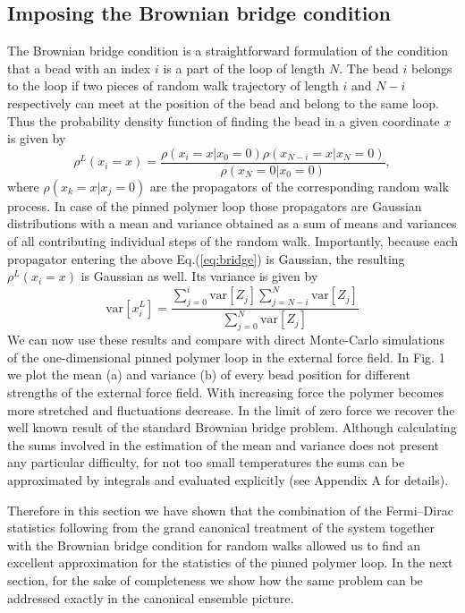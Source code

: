 \documentclass[aps,showpacs,twocolumn,floatfix,prx,superscriptaddress]{revtex4-1}
\begin{document}
\subsection{Imposing the Brownian bridge condition}
The Brownian bridge condition is a straightforward formulation of the condition
that a bead with an index $i$ is a part of the loop of length $N$. The bead $i$
belongs to the loop if two pieces of random walk trajectory of length $i$ and
$N-i$ respectively can meet at the position of the bead and belong to the same
loop. Thus the probability density function of finding the bead in a given
coordinate $x$ is given by
\begin{equation}
    \label{eq:bridge}
    \rho^L\left(x_i = x\right) = \frac{\rho\left(x_i = x \vert x_0 = 0\right)
        \rho\left(x_{N-i} = x \vert x_N = 0\right)}{\rho\left(x_N = 0 \vert x_0
            = 0\right)},
\end{equation}
where $ \rho\left(x_k = x \vert x_j = 0\right)$ are the propagators of the
corresponding random walk process. In case of the pinned polymer loop those
propagators are Gaussian distributions with a mean and variance obtained as a
sum of means and variances of all contributing individual steps of the random
walk. Importantly, because each propagator entering the above
Eq.(\ref{eq:bridge}) is Gaussian, the resulting $\rho^L\left(x_i = x\right)$ is
Gaussian as well. Its variance is given by
\begin{equation}
    \text{var}\left[x_i^L\right] =
    \frac{\sum_{j=0}^i\text{var}\left[Z_j\right]\sum_{j=N-i}^N\text{var}\left[Z_j\right]}{\sum_{j=0}^N\text{var}\left[Z_j\right]}
\end{equation}
We can now use these results and compare with direct Monte-Carlo simulations of
the one-dimensional pinned polymer loop in the external force field. In Fig. 1
we plot the mean (a) and variance (b) of every bead position for different
strengths of the external force field. With increasing force the polymer becomes
more stretched and fluctuations decrease. In the limit of zero force we recover
the well known result of the standard Brownian bridge problem. Although
calculating the sums involved in the estimation of the mean and variance does
not present any particular difficulty, for not too small temperatures the sums
can be approximated by integrals and evaluated explicitly (see Appendix A for
details). 

Therefore in this section we have shown that the combination of the Fermi--Dirac
statistics following from the grand canonical treatment of the system together
with the Brownian bridge condition for random walks allowed us to find an
excellent approximation for the statistics of the pinned polymer loop. In the
next section, for the sake of completeness we show how the same problem can be
addressed exactly in the canonical ensemble picture.
\end{document}
